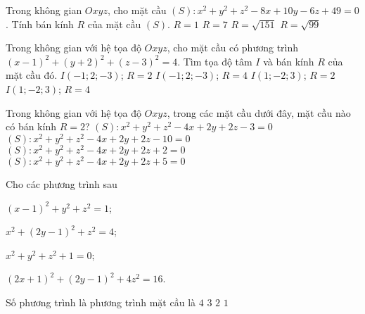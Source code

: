 \begin{ex}%
	Trong không gian $Oxyz$, cho mặt cầu $(S)\colon x^2+y^2+z^2-8x+10y-6z+49=0$. Tính bán kính $R$ của mặt cầu $(S)$.
	\choice
	{\True $R=1$}
	{$R=7$}
	{$R=\sqrt{151}$}
	{$R=\sqrt{99}$}
\end{ex}
		
\begin{ex}%
	Trong không gian với hệ tọa độ $Oxyz$, cho mặt cầu có phương trình $(x-1)^2+(y+2)^2+(z-3)^2=4$. Tìm tọa độ tâm $I$ và bán kính $R$ của mặt cầu đó.
	\choice
	{$I(-1;2;-3)$; $R=2$}
	{$I(-1;2;-3)$; $R=4$}
	{\True $I(1;-2;3)$; $R=2$}
	{$I(1;-2;3)$; $R=4$}
\end{ex}		
		
\begin{ex}%
	Trong không gian với hệ tọa độ $Oxyz$, trong các mặt cầu dưới đây, mặt cầu nào có bán kính $R=2$?
	\choice
	{$(S)\colon x^2+y^2+z^2-4x+2y+2z-3=0$}
	{$(S)\colon x^2+y^2+z^2-4x+2y+2z-10=0$}
	{\True $(S)\colon x^2+y^2+z^2-4x+2y+2z+2=0$}
	{$(S)\colon x^2+y^2+z^2-4x+2y+2z+5=0$}
\end{ex}
		
\begin{ex}%
	Cho các phương trình sau
	\begin{listEX}[2]
		\item $\left(x-1\right)^2+y^2+z^2=1$;
		\item $x^2+\left(2y-1\right)^2+z^2=4$;
		\item $x^2+y^2+z^2+1=0$;
		\item $\left(2x+1\right)^2+\left(2y-1\right)^2+4z^2=16$.
	\end{listEX}
	Số phương trình là phương trình mặt cầu là
	\choice
	{$4$}
	{$3$}
	{\True $2$}
	{$1$}
\end{ex}
		
